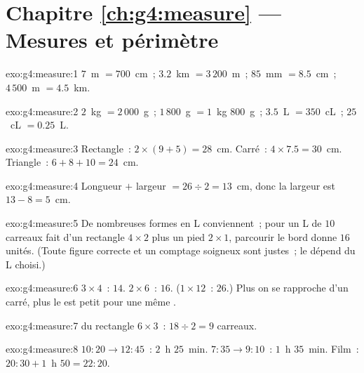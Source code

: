 \section*{Chapitre \ref{ch:g4:measure} --- Mesures et périmètre}

\begin{solution}{exo:g4:measure:1}
$7$~m $= 700$~cm~; \quad $3.2$~km $= 3\,200$~m~; \quad
$85$~mm $= 8.5$~cm~; \quad $4\,500$~m $= 4.5$~km.
\end{solution}

\begin{solution}{exo:g4:measure:2}
$2$~kg $= 2\,000$~g~; \quad $1\,800$~g $= 1$~kg $800$~g~; \quad
$3.5$~L $= 350$~cL~; \quad $25$~cL $= 0.25$~L.
\end{solution}

\begin{solution}{exo:g4:measure:3}
Rectangle~: $2 \times (9 + 5) = 28$~cm. Carré~:
$4 \times 7.5 = 30$~cm. Triangle~: $6 + 8 + 10 = 24$~cm.
\end{solution}

\begin{solution}{exo:g4:measure:4}
Longueur $+$ largeur $= 26 \div 2 = 13$~cm, donc la largeur est
$13 - 8 = 5$~cm.
\end{solution}

\begin{solution}{exo:g4:measure:5}
De nombreuses formes en L conviennent~; pour un L de $10$ carreaux
fait d'un rectangle $4 \times 2$ plus un pied $2 \times 1$,
parcourir le bord donne $16$ unités. (Toute figure correcte et un
comptage soigneux sont justes~; le  dépend du L choisi.)
\end{solution}

\begin{solution}{exo:g4:measure:6}
$3 \times 4$~:  $14$. $2 \times 6$~:  $16$.
($1 \times 12$~:  $26$.) Plus on se rapproche d'un carré,
plus le  est petit pour une même .
\end{solution}

\begin{solution}{exo:g4:measure:7}
 du rectangle $6 \times 3$~: $18 \div 2 = 9$ carreaux.
\end{solution}

\begin{solution}{exo:g4:measure:8}
$10{:}20 \to 12{:}45$~: $2$~h $25$~min. $7{:}35 \to 9{:}10$~:
$1$~h $35$~min. Film~: $20{:}30 + 1$~h $50 = 22{:}20$.
\end{solution}

